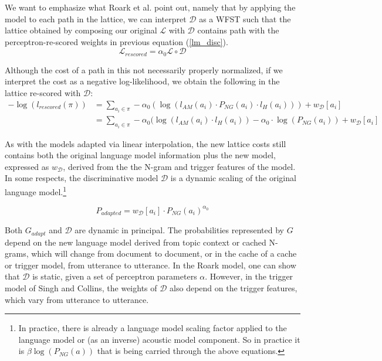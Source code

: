 We want to emphasize what Roark et al. point out, namely that by applying the model to each path in the lattice, we can interpret $\mathcal{D}$ as a WFST such that the lattice obtained by composing our original $\mathcal{L}$ with $\mathcal{D}$ contains path with the perceptron-re-scored weights in previous equation (\ref{lm_disc}).
\begin{equation}
\mathcal{L}_{rescored} = \alpha_0\mathcal{L} \circ \mathcal{D}
\label{eqn:latrescore2}
\end{equation}

Although the cost of a path in this not necessarily properly normalized, if we interpret the cost as a negative log-likelihood, we obtain the following in the lattice re-scored with $\mathcal{D}$:
\begin{align}
-\log(l_{rescored}(\pi)) &= \sum_{a_i \in \pi} -\alpha_0 (\log(l_{AM}(a_i)\cdot P_{NG}(a_i) \cdot l_{H}(a_i))) + w_{\mathcal{D}}[a_i]\label{lm_disc2} \\
&= \sum_{a_i \in \pi} -\alpha_0 (\log(l_{AM}(a_i)\cdot l_{H}(a_i)) - \alpha_0 \cdot \log(P_{NG}(a_i)) + w_{\mathcal{D}}[a_i]\label{lm_disc3}
\end{align}

As with the models adapted via linear interpolation, the new lattice costs still contains both the original language model information plus the new model, expressed as $w_{\mathcal{D}}$, derived from the the N-gram and trigger features of the model.  In some respects, the discriminative model $\mathcal{D}$ is a dynamic scaling of the original language model.\footnote{In practice, there is already a language model scaling factor applied to the language model or (as an inverse) acoustic model component.  So in practice it is $\beta\log(P_{NG}(a))$ that is being carried through the above equations.}  

\begin{equation}
  P_{adapted} = w_{\mathcal{D}}[a_i]\cdot P_{NG}(a_i)^{\alpha_0}
\end{equation}  

Both $G_{adapt}$ and $\mathcal{D}$ are dynamic in principal.  The probabilities represented by $G$ depend on the new language model derived from topic context or cached N-grams, which will change from document to document, or in the cache of a cache or trigger model, from utterance to utterance.  In the Roark model, one can show that $\mathcal{D}$ is static, given a set of perceptron parameters $\alpha$.  However, in the trigger model of Singh and Collins, the weights of $\mathcal{D}$ also depend on the trigger features, which vary from utterance to utterance.  



